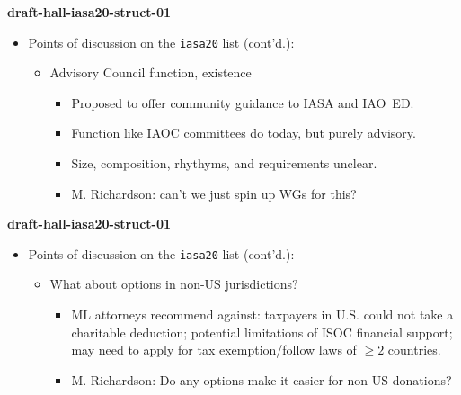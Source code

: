 \documentclass[helvetica]{seminar}
\newcommand{\heading}[1]{%
  \begin{center} 
    \large\bf 
    #1 
  \end{center} 
  \vspace{.4 in}}
\begin{document}
\begin{slide}

\heading{draft-hall-iasa20-struct-01}

\begin{itemize}
\item Points of discussion on the \texttt{iasa20} list (cont'd.):
  \begin{itemize}
  \item Advisory Council function, existence
    \begin{itemize}
    \item Proposed to offer community guidance to IASA and IAO~ED.
    \item Function like IAOC committees do today, but purely advisory.
    \item Size, composition, rhythyms, and requirements unclear.
    \item M. Richardson: can't we just spin up WGs for this?
    \end{itemize}
  \end{itemize}
\end{itemize}

\end{slide}


\begin{slide}

\heading{draft-hall-iasa20-struct-01}

\begin{itemize}
\item Points of discussion on the \texttt{iasa20} list (cont'd.):
  \begin{itemize}
  \item What about options in non-US jurisdictions?
    \begin{itemize}
    \item ML attorneys recommend against: taxpayers in U.S. could not
      take a charitable deduction; potential limitations of ISOC
      financial support; may need to apply for tax exemption/follow
      laws of $\geq2$ countries.
    \item M. Richardson: Do any options make it easier for non-US
      donations?
    \end{itemize}
  \end{itemize}
\end{itemize}

\end{slide}
\end{document}
